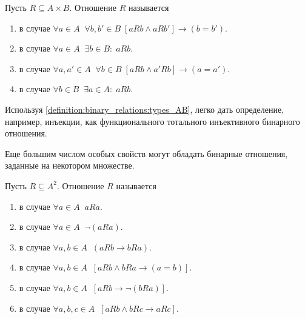 \begin{definition}
    \label{definition:binary_relations:types_AB}
    Пусть $ R \subseteq A \times B $.
    Отношение $ R $ называется
    \begin{enumerate}
        \item {} в случае $ \forall a \in A \;\; \forall b, b' \in B \; \left[ a R b \wedge a R b' \right] \rightarrow (b = b') $.
        \item {} в случае $ \forall a \in A \;\; \exists b \in B: \; a R b $.
        \item {} в случае $ \forall a, a' \in A \;\; \forall b \in B \; \left[ a R b \wedge a' R b \right] \rightarrow (a = a') $.
        \item {} в случае $ \forall b \in B \;\; \exists a \in A: \; a R b $.
    \end{enumerate}
\end{definition}

Используя \ref{definition:binary_relations:types_AB}, легко дать определение, например, инъекции,
как функционального тотального инъективного бинарного отношения.

Еще большим числом особых свойств могут обладать бинарные отношения, заданные на некотором множестве.
\begin{definition}
    \label{definition:binary_relations:types_AA}
    Пусть $ R \subseteq A^2 $.
    Отношение $ R $ называется
    \begin{enumerate}
        \item {} в случае $ \forall a \in A \;\; a R a $.
        \item {} в случае $ \forall a \in A \;\; \neg (a R a) $.
        \item {} в случае $ \forall a, b \in A \;\; \left( a R b \rightarrow b R a \right) $.
        \item {} в случае $ \forall a, b \in A \;\; \left[ a R b \wedge b R a \rightarrow (a = b) \right] $.
        \item {} в случае $ \forall a, b \in A \;\; \left[ a R b \rightarrow \neg (b R a) \right] $.
        \item {} в случае $ \forall a, b, c \in A \;\; \left[ a R b \wedge b R c \rightarrow a R c \right] $.
    \end{enumerate}
\end{definition}


